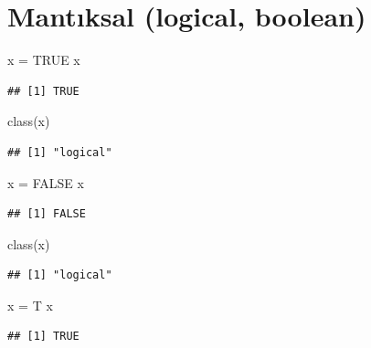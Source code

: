 \documentclass[
]{book}
\newenvironment{Shaded}{\begin{snugshade}}{\end{snugshade}}
\newcommand{\ConstantTok}[1]{\textcolor[rgb]{0.00,0.00,0.00}{#1}}
\newcommand{\FunctionTok}[1]{\textcolor[rgb]{0.00,0.00,0.00}{#1}}
\newcommand{\NormalTok}[1]{#1}
\newcommand{\OtherTok}[1]{\textcolor[rgb]{0.56,0.35,0.01}{#1}}
\begin{document}
\hypertarget{mantux131ksal-logical-boolean}{%
\section{Mantıksal (logical, boolean)}\label{mantux131ksal-logical-boolean}}

\begin{Shaded}
\begin{Highlighting}[]
\NormalTok{x }\OtherTok{=} \ConstantTok{TRUE}
\NormalTok{x}
\end{Highlighting}
\end{Shaded}

\begin{verbatim}
## [1] TRUE
\end{verbatim}

\begin{Shaded}
\begin{Highlighting}[]
\FunctionTok{class}\NormalTok{(x)}
\end{Highlighting}
\end{Shaded}

\begin{verbatim}
## [1] "logical"
\end{verbatim}

\begin{Shaded}
\begin{Highlighting}[]
\NormalTok{x }\OtherTok{=} \ConstantTok{FALSE}
\NormalTok{x}
\end{Highlighting}
\end{Shaded}

\begin{verbatim}
## [1] FALSE
\end{verbatim}

\begin{Shaded}
\begin{Highlighting}[]
\FunctionTok{class}\NormalTok{(x)}
\end{Highlighting}
\end{Shaded}

\begin{verbatim}
## [1] "logical"
\end{verbatim}

\begin{Shaded}
\begin{Highlighting}[]
\NormalTok{x }\OtherTok{=}\NormalTok{ T}
\NormalTok{x}
\end{Highlighting}
\end{Shaded}

\begin{verbatim}
## [1] TRUE
\end{verbatim}
\end{document}
